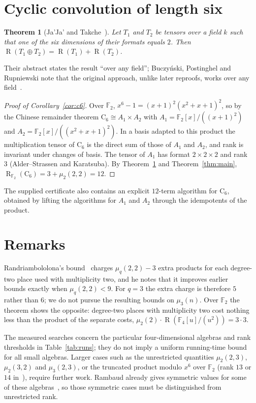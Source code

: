 \documentclass[11pt]{amsart}
\newtheorem{theorem}{Theorem}[section]
\theoremstyle{definition}
\theoremstyle{remark}
\newcommand{\F}{\mathbb F}
\newcommand{\R}{\operatorname{R}}
\begin{document}
\section{Cyclic convolution of length six}\label{sec:c6}

\begin{theorem}[Ja'Ja' and Takche~\cite{JaJaTakche1986}]\label{thm:jt}
Let $T_1$ and $T_2$ be tensors over a field $k$ such that one of the six dimensions of their formats equals $2$. Then $\R(T_1\oplus T_2)=\R(T_1)+\R(T_2)$.
\end{theorem}

Their abstract states the result ``over any field''; Buczy\'nski, Postinghel and Rupniewski note that the original approach, unlike later reproofs, works over any field~\cite[\S3.2]{BPR2019}.

\begin{proof}[Proof of Corollary~\ref{cor:c6}]
Over $\F_2$, $x^6-1=(x+1)^2(x^2+x+1)^2$, so by the Chinese remainder theorem $\mathrm C_6\cong A_1\times A_2$ with $A_1=\F_2[x]/((x+1)^2)$ and $A_2=\F_2[x]/((x^2+x+1)^2)$. In a basis adapted to this product the multiplication tensor of $\mathrm C_6$ is the direct sum of those of $A_1$ and $A_2$, and rank is invariant under changes of basis. The tensor of $A_1$ has format $2\times2\times2$ and rank $3$ (Alder--Strassen and Karatsuba). By Theorem~\ref{thm:jt} and Theorem~\ref{thm:main}, $\R_{\F_2}(\mathrm C_6)=3+\mu_2(2,2)=12$.
\end{proof}

The supplied certificate also contains an explicit $12$-term algorithm for $\mathrm C_6$, obtained by lifting the algorithms for $A_1$ and $A_2$ through the idempotents of the product.

\section{Remarks}

Randriambololona's bound~\cite[(78)]{Randriambololona2012} charges $\mu_q(2,2)-3$ extra products for each degree-two place used with multiplicity two, and he notes that it improves earlier bounds exactly when $\mu_q(2,2)<9$. For $q=3$ the extra charge is therefore $5$ rather than $6$; we do not pursue the resulting bounds on $\mu_3(n)$. Over $\F_2$ the theorem shows the opposite: degree-two places with multiplicity two cost nothing less than the product of the separate costs, $\mu_2(2)\cdot\R(\F_4[u]/(u^2))=3\cdot3$.

The measured searches concern the particular four-dimensional algebras and rank thresholds in Table~\ref{tab:runs}; they do not imply a uniform running-time bound for all small algebras. Larger cases such as the unrestricted quantities $\mu_2(2,3)$, $\mu_2(3,2)$ and $\mu_3(2,3)$, or the truncated product modulo $x^6$ over $\F_2$ (rank $13$ or $14$ in~\cite{Wang2026}), require further work. Rambaud already gives symmetric values for some of these algebras~\cite{RambaudThesis}, so those symmetric cases must be distinguished from unrestricted rank.
\end{document}
